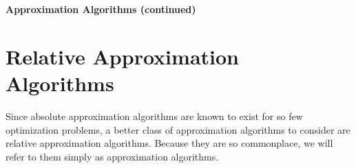 \documentclass{article}
\begin{document}
%


%
%
%
%

%




\begin{center}
{\large \bf Approximation Algorithms (continued)}
\end{center}

\section{Relative Approximation Algorithms}

Since absolute approximation algorithms are known to exist for so few optimization problems, a
better class of approximation algorithms to consider are relative approximation algorithms.
Because they are so commonplace, we will refer to them simply as approximation algorithms.
\end{document}
